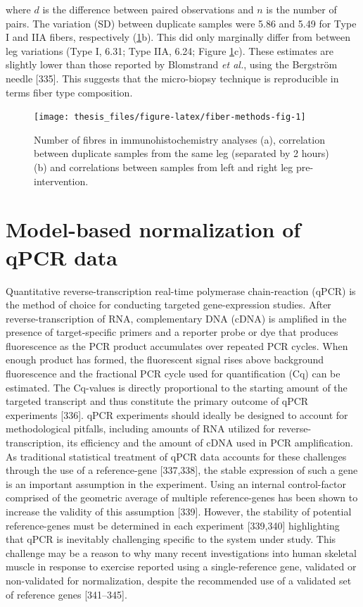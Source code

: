 \documentclass[twoside,10pt]{gihclass} %
\begin{document}
where \(d\) is the difference between paired observations and \(n\) is the number of pairs.
The variation (SD) between duplicate samples were 5.86 and 5.49 for Type I and IIA fibers, respectively (\ref{fig:fiber-methods-fig}b).
This did only marginally differ from between leg variations (Type I, 6.31; Type IIA, 6.24; Figure \ref{fig:fiber-methods-fig}c).
These estimates are slightly lower than those reported by Blomstrand \emph{et al.}, using the Bergström needle
{[}335{]}.
This suggests that the micro-biopsy technique is reproducible in terms fiber type composition.
\begin{figure}

{\centering \texttt{[image: thesis\_files/figure-latex/fiber-methods-fig-1]} 

}

\caption[Characteristics of biopsy samples used in immunohistochemistry analyses.]{Number of fibres in immunohistochemistry analyses (a), correlation between duplicate samples from the same leg (separated by 2 hours) (b) and correlations between samples from left and right leg pre-intervention.}\label{fig:fiber-methods-fig}
\end{figure}
\hypertarget{model-based-normalization-of-qpcr-data}{%
\section{Model-based normalization of qPCR data}\label{model-based-normalization-of-qpcr-data}}

Quantitative reverse-transcription real-time polymerase chain-reaction (qPCR) is the method of choice for conducting targeted gene-expression studies.
After reverse-transcription of RNA, complementary DNA (cDNA) is amplified in the presence of target-specific primers and a reporter probe or dye that produces fluorescence as the PCR product accumulates over repeated PCR cycles. When enough product has formed, the fluorescent signal rises above background fluorescence and the fractional PCR cycle used for quantification (Cq) can be estimated. The Cq-values is directly proportional to the starting amount of the targeted transcript and thus constitute the primary outcome of qPCR experiments
{[}336{]}.
qPCR experiments should ideally be designed to account for methodological pitfalls, including amounts of RNA utilized for reverse-transcription, its efficiency and the amount of cDNA used in PCR amplification.
As traditional statistical treatment of qPCR data accounts for these challenges through the use of a reference-gene {[}337,338{]}, the stable expression of such a gene is an important assumption in the experiment.
Using an internal control-factor comprised of the geometric average of multiple reference-genes has been shown to increase the validity of this assumption {[}339{]}.
However, the stability of potential reference-genes must be determined in each experiment {[}339,340{]} highlighting that qPCR is inevitably challenging specific to the system under study.
This challenge may be a reason to why many recent investigations into human skeletal muscle in response to exercise reported using a single-reference gene, validated or non-validated for normalization, despite the recommended use of a validated set of reference genes {[}341--345{]}.
\end{document}
